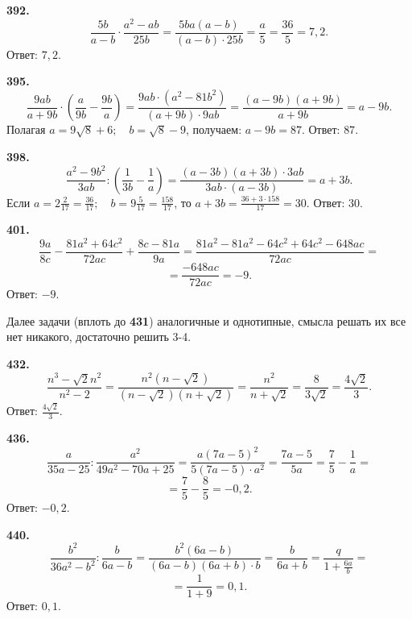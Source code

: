 \textbf{392.} $$\frac{5b}{a-b}\cdot\frac{a^2-ab}{25b}=\frac{5ba\left(a-b\right)}{\left(a-b\right)\cdot25b}=\frac{a}{5}=\frac{36}{5}=7,2.$$ \newline \null \hspace*{\fill} Ответ: $7,2$. 

\textbf{395.} $$\frac{9ab}{a+9b}\cdot\left(\frac{a}{9b}-\frac{9b}{a}\right)=\frac{9ab\cdot\left(a^2-81b^2\right)}{\left(a+9b\right)\cdot9ab}=\frac{\left(a-9b\right)\left(a+9b\right)}{a+9b}=a-9b.$$
Полагая $a=9\sqrt{8}+6;\quad b=\sqrt{8}-9$, получаем: $a-9b=87.$ \newline \null \hspace*{\fill} Ответ: $87$. 

\textbf{398.} $$\frac{a^2-9b^2}{3ab}:\left(\frac{1}{3b}-\frac{1}{a}\right)=\frac{\left(a-3b\right)\left(a+3b\right)\cdot3ab}{3ab\cdot\left(a-3b\right)}=a+3b.$$ Если $a=2\frac{2}{17}=\frac{36}{17};\quad b=9\frac{5}{17}=\frac{158}{17}$, то $a+3b=\frac{36+3\cdot158}{17}=30.$ \newline \null \hspace*{\fill} Ответ: $30$. 

\newpage \textbf{401.} $$\frac{9a}{8c}-\frac{81a^2+64c^2}{72ac}+\frac{8c-81a}{9a}=\frac{81a^2-81a^2-64c^2+64c^2-648ac}{72ac}=$$ $$=\frac{-648ac}{72ac}=-9.$$ \newline \null \hspace*{\fill} Ответ: $-9$. 

Далее задачи (вплоть до \textbf{431})  аналогичные и однотипные, смысла решать их все нет никакого, достаточно решить 3-4.

\textbf{432.} $$\frac{n^3-\sqrt{2}n^2}{n^2-2}=\frac{n^2\left(n-\sqrt{2}\right)}{\left(n-\sqrt2\right)\left(n+\sqrt{2}\right)}=\frac{n^2}{n+\sqrt{2}}=\frac{8}{3\sqrt{2}}=\frac{4\sqrt{2}}{3}.$$ \newline \null \hspace*{\fill} Ответ: $\frac{4\sqrt{2}}{3}$. 

\textbf{436.} $$\frac{a}{35a-25}:\frac{a^2}{49a^2-70a+25}=\frac{a\left(7a-5\right)^2}{5\left(7a-5\right)\cdot a^2}=\frac{7a-5}{5a}=\frac{7}{5}-\frac{1}{a}=$$ $$=\frac{7}{5}-\frac{8}{5}=-0,2.$$ \newline \null \hspace*{\fill} Ответ: $-0,2$. 

\textbf{440.} $$\frac{b^2}{36a^2-b^2}:\frac{b}{6a-b}=\frac{b^2\left(6a-b\right)}{\left(6a-b\right)\left(6a+b\right)\cdot b}=\frac{b}{6a+b}=\frac{q}{1+\frac{6a}{b}}=$$ $$=\frac{1}{1+9}=0,1.$$ \newline \null \hspace*{\fill} Ответ: $0,1$. 

